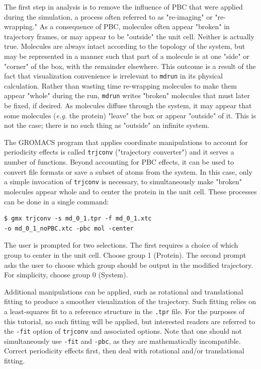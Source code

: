 \documentclass[9pt,tutorial]{livecoms}
\begin{document}
The first step in analysis is to remove the influence of PBC that were applied during the simulation, a process often referred to as "re-imaging" or "re-wrapping." As a consequence of PBC, molecules often appear "broken" in trajectory frames, or may appear to be "outside" the unit cell. Neither is actually true. Molecules are always intact according to the topology of the system, but may be represented in a manner such that part of a molecule is at one "side" or "corner" of the box, with the remainder elsewhere. This outcome is a result of the fact that visualization convenience is irrelevant to \texttt{mdrun} in its physical calculation. Rather than wasting time re-wrapping molecules to make them appear "whole" during the run, \texttt{mdrun} writes "broken" molecules that must later be fixed, if desired. As molecules diffuse through the system, it may appear that some molecules ({\em e.g.} the protein) "leave" the box or appear "outside" of it. This is not the case; there is no such thing as "outside" an infinite system.

The GROMACS program that applies coordinate manipulations to account for periodicity effects is called \texttt{trjconv} ("trajectory converter") and it serves a number of functions. Beyond accounting for PBC effects, it can be used to convert file formats or save a subset of atoms from the system. In this case, only a simple invocation of \texttt{trjconv} is necessary, to simultaneously make "broken" molecules appear whole and to center the protein in the unit cell. These processes can be done in a single command:

\begin{verbatim}
$ gmx trjconv -s md_0_1.tpr -f md_0_1.xtc 
-o md_0_1_noPBC.xtc -pbc mol -center
\end{verbatim}

The user is prompted for two selections. The first requires a choice of which group to center in the unit cell. Choose group 1 (Protein). The second prompt asks the user to choose which group should be output in the modified trajectory. For simplicity, choose group 0 (System).

Additional manipulations can be applied, such as rotational and translational fitting to produce a smoother visualization of the trajectory. Such fitting relies on a least-squares fit to a reference structure in the \texttt{.tpr} file. For the purposes of this tutorial, no such fitting will be applied, but interested readers are referred to the \texttt{-fit} option of \texttt{trjconv} and associated options. Note that one should not simultaneously use \texttt{-fit} and \texttt{-pbc}, as they are mathematically incompatible. Correct periodicity effects first, then deal with rotational and/or translational fitting.
\end{document}
